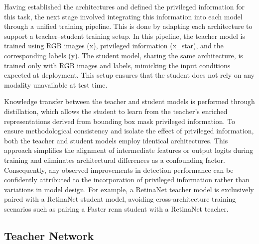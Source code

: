 Having established the architectures and defined the privileged information for this task, the next stage involved integrating this information into each model through a unified training pipeline. This is done by adapting each architecture to support a teacher–student training setup.
In this pipeline, the teacher model is trained using RGB images (\gls{x}), privileged information (\gls{x_star}), and the corresponding labels (\gls{y}). The student model, sharing the same architecture, is trained only with RGB images and labels, mimicking the input conditions expected at deployment. This setup ensures that the student does not rely on any modality unavailable at test time.

Knowledge transfer between the teacher and student models is performed through distillation, which allows the student to learn from the teacher’s enriched representations derived from bounding box mask privileged information. To ensure methodological consistency and isolate the effect of privileged information, both the teacher and student models employ identical architectures. This approach simplifies the alignment of intermediate features or output logits during training and eliminates architectural differences as a confounding factor. Consequently, any observed improvements in detection performance can be confidently attributed to the incorporation of privileged information rather than variations in model design. For example, a RetinaNet teacher model is exclusively paired with a RetinaNet student model, avoiding cross-architecture training scenarios such as pairing a Faster \gls{rcnn} student with a RetinaNet teacher.


\subsection{Teacher Network}
\label{subsec:4_teacher}

